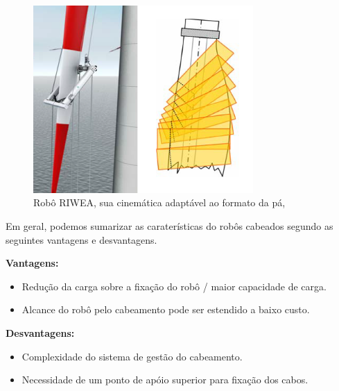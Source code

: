 \begin{figure}[!h]
	\centering
	\includegraphics[width=8.4cm]{sota/figs/cables/riwea}
	\caption{Robô RIWEA, sua cinemática adaptável ao formato da pá, \cite{riwea}}
	\label{fig:cables:riwea}
\end{figure}

Em geral, podemos sumarizar as caraterísticas do robôs cabeados segundo as
seguintes vantagens e desvantagens.

\textbf{Vantagens:}
\begin{itemize}
  \item Redução da carga sobre a fixação do robô / maior capacidade de carga.
  \item Alcance do robô pelo cabeamento pode ser estendido a baixo custo.  
\end{itemize}

\textbf{Desvantagens:}
\begin{itemize}
  \item Complexidade do sistema de gestão do cabeamento.
  \item Necessidade de um ponto de apóio superior para fixação dos cabos.
\end{itemize}


